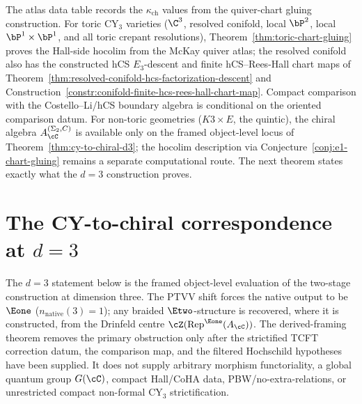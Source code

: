 The atlas data table records the $\kappa_{\mathrm{ch}}$ values from the quiver-chart gluing construction. For toric CY$_3$ varieties ($\C^3$, resolved conifold, local $\bP^2$, local $\bP^1 \times \bP^1$, and all toric crepant resolutions), Theorem~\ref{thm:toric-chart-gluing} proves the Hall-side hocolim from the McKay quiver atlas; the resolved conifold also has the constructed hCS \(E_3\)-descent and finite hCS--Rees-Hall chart maps of Theorem~\ref{thm:resolved-conifold-hcs-factorization-descent} and Construction~\ref{constr:conifold-finite-hcs-rees-hall-chart-map}. Compact comparison with the Costello--Li/hCS boundary algebra is conditional on the oriented comparison datum. For non-toric geometries ($K3 \times E$, the quintic), the chiral algebra $A_\cC^{(\Sigma_2,C)}$ is available only on the framed object-level locus of Theorem~\ref{thm:cy-to-chiral-d3}; the hocolim description via Conjecture~\ref{conj:e1-chart-gluing} remains a separate computational route. The next theorem states exactly what the $d = 3$ construction proves.

\section{The CY-to-chiral correspondence at \texorpdfstring{$d = 3$}{d = 3}}
\label{sec:cy-to-chiral-d3-programme}

The $d = 3$ statement below is the framed object-level evaluation of the two-stage construction at dimension three. The PTVV shift forces the native output to be $\Eone$ \textup{(}$n_{\mathrm{native}}(3) = 1$\textup{)}; any braided $\Etwo$-structure is recovered, where it is constructed, from the Drinfeld centre $\cZ(\mathrm{Rep}^{\Eone}(A_\cC))$. The derived-framing theorem removes the primary obstruction only after the strictified TCFT correction datum, the comparison map, and the filtered Hochschild hypotheses have been supplied. It does not supply arbitrary morphism functoriality, a global quantum group $G(\cC)$, compact Hall/CoHA data, PBW/no-extra-relations, or unrestricted compact non-formal CY$_3$ strictification.


